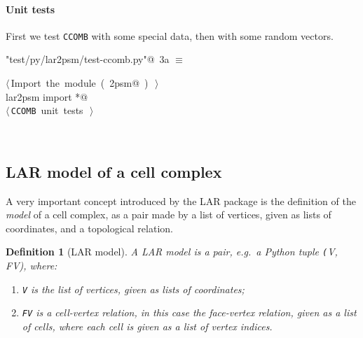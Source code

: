 \documentclass[11pt,oneside]{article}	%
\newtheorem{definition}{Definition}
\begin{document}
\paragraph{Unit tests}
First we test \texttt{CCOMB} with some special data, then with some random vectors.
\begin{flushleft} \small
\begin{minipage}{\linewidth} \label{scrap5}
\protect{}\verb@"test/py/lar2psm/test-ccomb.py"@\nobreak\ {\footnotesize 3a }$\equiv$
\vspace{-1ex}
\begin{list}{}{} \item
\mbox{}\verb@@\hbox{$\langle\,$Import the module\nobreak\ ({\footnotesize {}\label{scrap6}
 }\mbox{}\verb@lar2psm@ ) {\footnotesize {}}$\,\rangle$}\verb@@\\
\mbox{}\verb@from lar2psm import *@\\
\mbox{}\verb@@\hbox{$\langle\,$\texttt{CCOMB} unit tests\nobreak\ {\footnotesize {}}$\,\rangle$}\verb@@\\
\mbox{}\verb@@{\NWsep}
\end{list}
\vspace{-2ex}
\end{minipage}\\[4ex]
\end{flushleft}

\subsection{LAR model of a cell complex}

A very important concept introduced by the LAR package is the definition of the \emph{model} of a cell complex, as a pair made by a list of vertices, given as lists of coordinates, and a topological relation.

\begin{definition}[LAR model]
A \emph{LAR model} is a pair, e.g.~a Python tuple \emph{\texttt(V, FV)}, where:
\begin{enumerate}
\item \texttt{V} is the list of vertices, given as lists of coordinates;
\item \texttt{FV} is a \emph{cell-vertex} relation, in this case the face-vertex relation, given as a list of cells, where each cell is given as a list of vertex indices.
\end{enumerate}
\end{definition}
\end{document}
